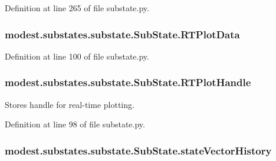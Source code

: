 Definition at line 265 of file substate.\+py.

\subsubsection[{\texorpdfstring{R\+T\+Plot\+Data}{RTPlotData}}]{\setlength{\rightskip}{0pt plus 5cm}modest.\+substates.\+substate.\+Sub\+State.\+R\+T\+Plot\+Data\hspace{0.3cm}{\ttfamily [inherited]}}\hypertarget{classmodest_1_1substates_1_1substate_1_1SubState_a9fefae1facc797a1132fb61a55e9ffa1}{}\label{classmodest_1_1substates_1_1substate_1_1SubState_a9fefae1facc797a1132fb61a55e9ffa1}


Definition at line 100 of file substate.\+py.

\subsubsection[{\texorpdfstring{R\+T\+Plot\+Handle}{RTPlotHandle}}]{\setlength{\rightskip}{0pt plus 5cm}modest.\+substates.\+substate.\+Sub\+State.\+R\+T\+Plot\+Handle\hspace{0.3cm}{\ttfamily [inherited]}}\hypertarget{classmodest_1_1substates_1_1substate_1_1SubState_a37ded775b84cea85b4dce0f1b16286c4}{}\label{classmodest_1_1substates_1_1substate_1_1SubState_a37ded775b84cea85b4dce0f1b16286c4}


Stores handle for real-\/time plotting. 



Definition at line 98 of file substate.\+py.

\subsubsection[{\texorpdfstring{state\+Vector\+History}{stateVectorHistory}}]{\setlength{\rightskip}{0pt plus 5cm}modest.\+substates.\+substate.\+Sub\+State.\+state\+Vector\+History\hspace{0.3cm}{\ttfamily [inherited]}}\hypertarget{classmodest_1_1substates_1_1substate_1_1SubState_a38c12c9d0899bc1161f3502b584517a2}{}\label{classmodest_1_1substates_1_1substate_1_1SubState_a38c12c9d0899bc1161f3502b584517a2}


